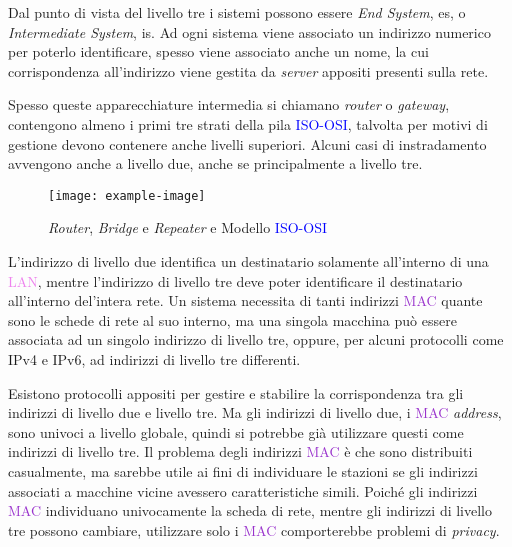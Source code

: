 \documentclass{article}
\numberwithin{equation}{subsection}
\begin{document}
Dal punto di vista del livello tre i sistemi possono essere \textit{End System}, \textcolor{Periwinkle}{es}, o \textit{Intermediate System}, \textcolor{Emerald}{is}. Ad ogni sistema viene associato un indirizzo numerico per 
poterlo identificare, spesso viene associato anche un nome, la cui corrispondenza all'indirizzo viene gestita da \textit{server} appositi presenti sulla rete. 

Spesso queste apparecchiature intermedia si chiamano \textit{router} o \textit{gateway}, contengono almeno i primi tre strati della pila \textcolor{blue}{ISO-OSI}, talvolta per motivi di gestione devono 
contenere anche livelli superiori. Alcuni casi di instradamento avvengono anche a livello due, anche se principalmente a livello tre. 


\begin{figure}[H]%
    \centering%
    \texttt{[image: example-image]}%
    \caption{\textit{Router}, \textit{Bridge} e \textit{Repeater} e Modello \textcolor{blue}{ISO-OSI}}%
\end{figure}


L'indirizzo di livello due identifica un destinatario solamente all'interno di una \textcolor{violet}{LAN}, mentre l'indirizzo di livello tre deve poter identificare il destinatario 
all'interno del'intera rete. Un sistema necessita di tanti indirizzi \textcolor{DarkOrchid}{MAC} quante sono le schede di rete al suo interno, ma una singola macchina può essere associata 
ad un singolo indirizzo di livello tre, oppure, per alcuni protocolli come \textcolor{BurntOrange}{IPv4} e \textcolor{OliveGreen}{IPv6}, ad indirizzi di livello tre differenti.  

Esistono protocolli appositi per gestire e stabilire la corrispondenza tra gli indirizzi di livello due e livello tre. Ma gli indirizzi di livello due, i \textcolor{DarkOrchid}{MAC} \textit{address}, 
sono univoci a livello globale, quindi si potrebbe già utilizzare questi come indirizzi di livello tre. Il problema degli indirizzi \textcolor{DarkOrchid}{MAC} è che sono distribuiti casualmente, ma sarebbe utile 
ai fini di individuare le stazioni se gli indirizzi associati a macchine vicine avessero caratteristiche simili. Poiché gli indirizzi \textcolor{DarkOrchid}{MAC} individuano univocamente 
la scheda di rete, mentre gli indirizzi di livello tre possono cambiare, utilizzare solo i \textcolor{DarkOrchid}{MAC} comporterebbe problemi di \textit{privacy}. 
\end{document}
